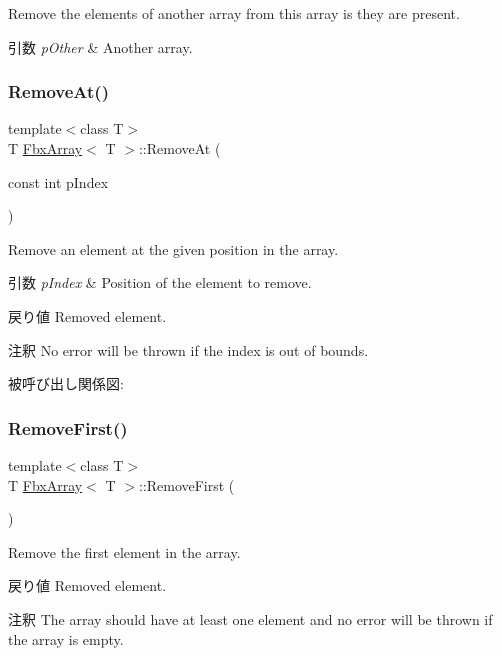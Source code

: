 Remove the elements of another array from this array is they are present. 
\begin{DoxyParams}{引数}
{\em p\+Other} & Another array. \\
\hline
\end{DoxyParams}
\mbox{\label{class_fbx_array_a6a4be3173c8ec89179b7cf21687d7d61}} 
\subsubsection{\texorpdfstring{Remove\+At()}{RemoveAt()}}
{\footnotesize\ttfamily template$<$class T$>$ \\
T \hyperlink{class_fbx_array}{Fbx\+Array}$<$ T $>$\+::Remove\+At (\begin{DoxyParamCaption}\item[{const int}]{p\+Index }\end{DoxyParamCaption})}

Remove an element at the given position in the array. 
\begin{DoxyParams}{引数}
{\em p\+Index} & Position of the element to remove. \\
\hline
\end{DoxyParams}
\begin{DoxyReturn}{戻り値}
Removed element. 
\end{DoxyReturn}
\begin{DoxyRemark}{注釈}
No error will be thrown if the index is out of bounds. 
\end{DoxyRemark}
被呼び出し関係図\+:
\mbox{\label{class_fbx_array_ade8f6c6fbc62584870d16ffd1e011559}} 
\subsubsection{\texorpdfstring{Remove\+First()}{RemoveFirst()}}
{\footnotesize\ttfamily template$<$class T$>$ \\
T \hyperlink{class_fbx_array}{Fbx\+Array}$<$ T $>$\+::Remove\+First (\begin{DoxyParamCaption}{ }\end{DoxyParamCaption})}

Remove the first element in the array. \begin{DoxyReturn}{戻り値}
Removed element. 
\end{DoxyReturn}
\begin{DoxyRemark}{注釈}
The array should have at least one element and no error will be thrown if the array is empty. 
\end{DoxyRemark}
\mbox{\label{class_fbx_array_aed7ae152655404e95e5107824721e93c}} 
